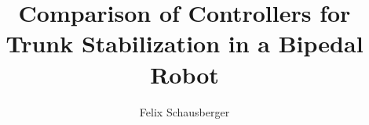 %
\usepackage{standalone}%
\usetikzlibrary{angles, arrows.meta, backgrounds, calc, decorations.pathmorphing, shapes.geometric, patterns, positioning, timeline, quotes}%
%
\usepackage[acronyms, toc]{glossaries}
\makenoidxglossaries
{} %
%
\graphicspath{{figures/}}%
%
%
\title[Comparison of Controllers for Trunk Stabilization in a Bipedal Robot]{Comparison of Controllers for Trunk Stabilization in a Bipedal Robot}%
\def\PresentationType{\AMlangGerEng{Auftaktvortrag}{Initial Presentation}}%
\def\PresentationThesisType{\AMlangMastersThesis}%
\author[F. Schausberger]{Felix Schausberger}%
\def\PresentationExaminer{\AMnamesProfRixen}%
\def\PresentationSupervisor{Dr.-Ing. Daniel Renjewski}%
\date{}%